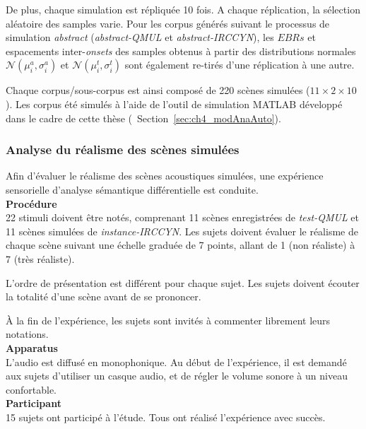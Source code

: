 De plus, chaque simulation est répliquée 10 fois. A chaque réplication, la sélection aléatoire des samples varie. Pour les corpus générés suivant le processus de simulation \emph{abstract} (\emph{abstract-QMUL} et \emph{abstract-IRCCYN}), les $EBRs$ et espacements inter-\emph{onsets} des samples obtenus à partir des distributions normales  $\mathcal{N}(\mu_i^a,\sigma_i^a)$ et $\mathcal{N}(\mu_i^t,\sigma_i^t)$ sont également re-tirés d'une réplication à une autre. 


Chaque corpus/sous-corpus est ainsi composé de 220 scènes simulées ($11\times2\times10$). Les corpus été simulés à l'aide de l'outil de simulation MATLAB développé dans le cadre de cette thèse (\cf~Section~\ref{sec:ch4_modAnaAuto}).

\subsubsection{Analyse du réalisme des scènes simulées}

Afin d'évaluer le réalisme des scènes acoustiques simulées, une expérience sensorielle d'analyse sémantique différentielle est conduite. \\

\textbf{Procédure} \\

22 stimuli doivent être notés, comprenant 11 scènes enregistrées de \emph{test-QMUL} et 11 scènes simulées de \emph{instance-IRCCYN}. Les sujets doivent évaluer le réalisme de chaque scène suivant une échelle graduée de 7 points, allant de 1 (non réaliste) à 7 (très réaliste). 

L'ordre de présentation est différent pour chaque sujet. Les sujets doivent écouter la totalité d'une scène avant de se prononcer.

À la fin de l'expérience, les sujets sont invités à commenter librement leurs notations. \\

\textbf{Apparatus} \\

L'audio est diffusé en monophonique. Au début de l'expérience, il est demandé aux sujets d'utiliser un casque audio, et de régler le volume sonore à un niveau confortable.  \\

\textbf{Participant} \\

15 sujets ont participé à l'étude. Tous ont réalisé l'expérience avec succès. \\

